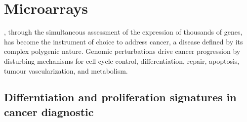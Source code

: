 \section{Microarrays}
\label{microarray-discussion}


, through the simultaneous assessment of the
expression of thousands of genes, has become the instrument of choice to address
cancer, a disease defined by its complex polygenic
nature.\cite{grant_microarrays_2004} Genomic perturbations drive cancer
progression by disturbing mechanisms for cell cycle control, differentiation,
 repair, apoptosis, tumour vascularization, and metabolism.

\subsection{Differntiation and proliferation signatures in cancer diagnostic}
\label{differentiation-proliferation}

\clearpage

